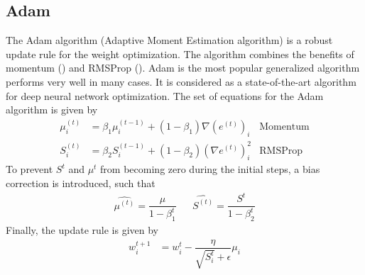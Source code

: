 \subsection{Adam}
The Adam algorithm (Adaptive Moment Estimation algorithm) is a robust update rule for the weight optimization. The algorithm combines the benefits of momentum () and RMSProp (). Adam is the most popular generalized algorithm performs very well in many cases. It is considered as a state-of-the-art algorithm for deep neural network optimization. The set of equations for the Adam algorithm is given by
\begin{align}
    \nonumber
    \mu^{(t)}_i &= \beta_1 {\mu}^{(t-1)}_i + (1-\beta_1)\nabla(e^{(t)})_i &\text{Momentum} \\
    \nonumber
    {S}^{(t)}_i &= \beta_2 {S}^{(t-1)}_i + (1-\beta_2)(\nabla e^{(t)})_i^2 &\text{RMSProp}    
\end{align}
To prevent $S^t$ and $\mu^t$ from becoming zero during the initial steps, a bias correction is introduced, such that
\begin{align*}
    \hat{\mu^{(t)}} = \dfrac{\mu}{1-\beta_1^t} & & \hat{S^{(t)}} = \dfrac{S^t}{1-\beta_2^t}
\end{align*}
Finally, the update rule is given by
\begin{align}
    \label{eq:Adam_def}
    {w}^{t+1}_i &= {w}^t_i - \dfrac{\eta}{\sqrt{S^t_i} + \epsilon}\mu_i
\end{align} 